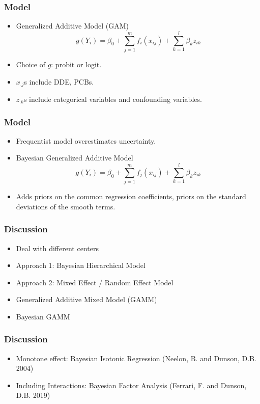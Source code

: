 \documentclass{beamer}
\begin{document}
\begin{frame}
\frametitle{Model}

\begin{itemize}

\item Generalized Additive Model (GAM)
$$g(Y_i) = \beta_0 + \sum_{j=1}^m f_i(x_{ij}) + \sum_{k=1}^l \beta_{k}z_{ik}$$

\item Choice of $g$: probit or logit.
\item $x_{.j}$s include DDE, PCBs.
\item $z_{.k}$s include categorical variables and confounding variables.

\end{itemize}
\end{frame}




\begin{frame}
\frametitle{Model}

\begin{itemize}

\item Frequentist model overestimates uncertainty.
\item Bayesian Generalized Additive Model
$$g(Y_i) = \beta_0 + \sum_{j=1}^m f_j(x_{ij}) + \sum_{k=1}^l \beta_{k}z_{ik}$$

\item Adds priors on the common regression coefficients, priors on the standard deviations of the smooth terms.


\end{itemize}
\end{frame}




\begin{frame}
\frametitle{Discussion}

\begin{itemize}

\item Deal with different centers
\item Approach 1: Bayesian Hierarchical Model
\item Approach 2: Mixed Effect / Random Effect Model
\item Generalized Additive Mixed Model (GAMM)
\item Bayesian GAMM 


\end{itemize}
\end{frame}


\begin{frame}
\frametitle{Discussion}

\begin{itemize}


\item Monotone effect: Bayesian Isotonic Regression (Neelon, B. and Dunson, D.B. 2004)
\item Including Interactions: Bayesian Factor Analysis (Ferrari, F. and Dunson, D.B. 2019)



\end{itemize}
\end{frame}
\end{document}
